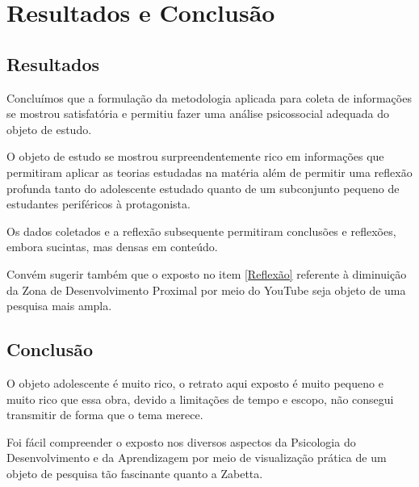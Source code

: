 \chapter{Resultados e Conclusão}

\section{Resultados}

Concluímos que a formulação da metodologia aplicada para coleta de informações se mostrou satisfatória e permitiu fazer uma análise psicossocial adequada do objeto de estudo.

O objeto de estudo se mostrou surpreendentemente rico em informações que permitiram aplicar as teorias estudadas na matéria além de permitir uma reflexão profunda tanto do adolescente estudado quanto de um subconjunto pequeno de estudantes periféricos à protagonista.

Os dados coletados e a reflexão subsequente permitiram conclusões e reflexões, embora sucintas, mas densas em conteúdo.

Convém sugerir também que o exposto no item \ref{Reflexão} referente à diminuição da Zona de Desenvolvimento Proximal por meio do YouTube seja objeto de uma pesquisa mais ampla.

\section{Conclusão}

O objeto adolescente é muito rico, o retrato aqui exposto é muito pequeno e muito rico que essa obra, devido a limitações de tempo e escopo, não consegui transmitir de forma que o tema merece.

Foi fácil compreender o exposto nos diversos aspectos da Psicologia do Desenvolvimento e da Aprendizagem por meio de visualização prática de um objeto de pesquisa tão fascinante quanto a Zabetta.
